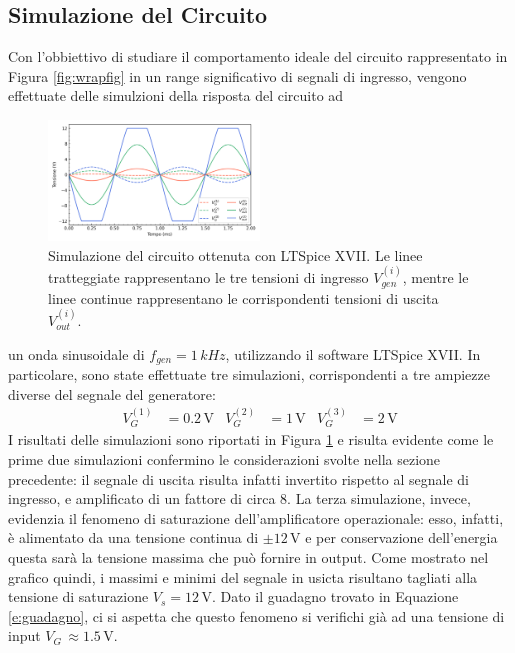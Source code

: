 \documentclass[a4paper,11pt]{article}
\begin{document}
\subsection{Simulazione del Circuito}\label{s:sim}
Con l'obbiettivo di studiare il comportamento ideale del circuito rappresentato in Figura \ref{fig:wrapfig} in un range significativo
di segnali di ingresso, vengono effettuate delle simulzioni della risposta del
circuito ad
\begin{figure}
\centering
\includegraphics[width=0.5\textwidth]{images/lin_simulation}
\caption{\footnotesize Simulazione del circuito ottenuta con LTSpice XVII. Le linee
  tratteggiate rappresentano le tre tensioni di ingresso $V_{gen}^{(i)}$, mentre le linee continue rappresentano le corrispondenti tensioni di uscita $V_{out}^{(i)}$.}
\label{fig:lin_sim}
\end{figure}
un onda sinusoidale di $f_{gen}=1 \, \si{kHz}$, utilizzando il software LTSpice
XVII. In particolare, sono state effettuate tre simulazioni, corrispondenti a tre ampiezze diverse
del segnale del generatore:
\begin{align*} V_{G}^{(1)} &= 0.2 \, \si{\volt}
  &
	V_{G}^{(2)}&=1 \, \si{\volt}
  &
	V_{G}^{(3)}&=2 \, \si{\volt}
\end{align*}
I risultati delle simulazioni sono riportati in Figura \ref{fig:lin_sim} e risulta evidente come le prime due simulazioni confermino le considerazioni svolte
nella sezione precedente: il segnale di uscita risulta infatti invertito rispetto al segnale di
ingresso, e amplificato di un fattore di circa $8$.
La terza simulazione, invece, evidenzia il fenomeno di saturazione dell'amplificatore operazionale: esso, infatti, è alimentato da
una tensione continua di $\pm 12 \,\si{\volt}$ e per conservazione dell'energia questa sarà
la tensione massima che può fornire in output. Come mostrato nel grafico quindi, i massimi e
minimi del segnale in usicta risultano tagliati alla tensione di saturazione  $V_{s}=12 \, \si{\volt}$.
Dato il guadagno trovato in Equazione \ref{e:guadagno}, ci si aspetta che questo fenomeno si verifichi già ad una tensione di input $V_{G}\, \approx 1.5\, \si{\volt}$.
\end{document}
